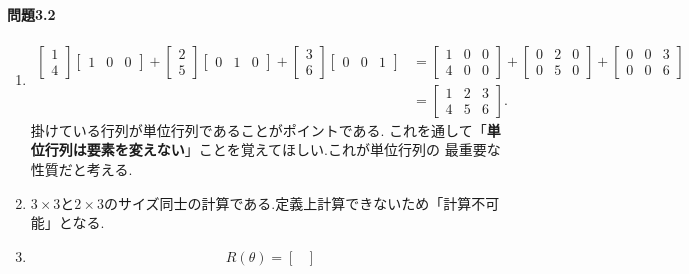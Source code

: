\paragraph{問題3.2}
\begin{enumerate}[label=(\arabic*)]
    \item \begin{align*}
        \begin{bmatrix}
            1 \\ 4
        \end{bmatrix}
        \begin{bmatrix}
            1 & 0 & 0
        \end{bmatrix}+
        \begin{bmatrix}
            2 \\ 5
        \end{bmatrix}
        \begin{bmatrix}
            0 & 1 & 0
        \end{bmatrix}+
        \begin{bmatrix}
            3 \\ 6
        \end{bmatrix}
        \begin{bmatrix}
            0 & 0 & 1
        \end{bmatrix} &=
        \begin{bmatrix}
            1 & 0 & 0 \\ 4 & 0 & 0
        \end{bmatrix}+
        \begin{bmatrix}
            0 & 2 & 0 \\ 0 & 5 & 0
        \end{bmatrix}+
        \begin{bmatrix}
            0 & 0 & 3 \\ 0 & 0 & 6
        \end{bmatrix} \\
        &=
        \begin{bmatrix}
        1 & 2 & 3 \\ 4 & 5 & 6
        \end{bmatrix}.
    \end{align*}
    掛けている行列が単位行列であることがポイントである.
    これを通して「\textbf{単位行列は要素を変えない}」ことを覚えてほしい.これが単位行列の
    最重要な性質だと考える.
    \item $3\times3$と$2\times3$のサイズ同士の計算である.定義上計算できないため「計算不可能」となる.
    \item \[R(\theta)=\begin{bmatrix}

\end{bmatrix}\]
\end{enumerate}
